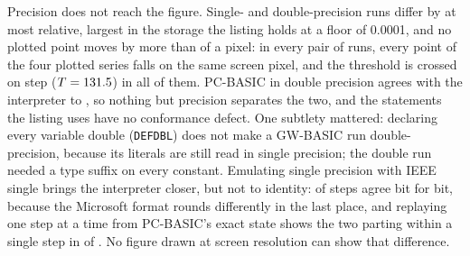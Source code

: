 Precision does not reach the figure. Single- and double-precision runs differ by at most \oracleSingleDoubleMaxRel{} relative, largest in the storage the listing holds at a floor of 0.0001, and no plotted point moves by more than \oracleSingleDoubleMaxPx{} of a pixel: in every pair of runs, every point of the four plotted series falls on the same screen pixel, and the threshold is crossed on step \oracleThresholdStep{} ($T = 131.5$) in all of them. PC-BASIC in double precision agrees with the interpreter to \oracleDoubleMaxRel{}, so nothing but precision separates the two, and the statements the listing uses have no conformance defect. One subtlety mattered: declaring every variable double (\texttt{DEFDBL}) does not make a GW-BASIC run double-precision, because its literals are still read in single precision; the double run needed a type suffix on every constant. Emulating single precision with IEEE single brings the interpreter closer, but not to identity: \oracleBitIdenticalEvery{} of \oracleSteps{} steps agree bit for bit, because the Microsoft format rounds differently in the last place, and replaying one step at a time from PC-BASIC's exact state shows the two parting within a single step in \oracleReplayDiffering{} of \oracleReplaySteps{}. No figure drawn at screen resolution can show that difference.

